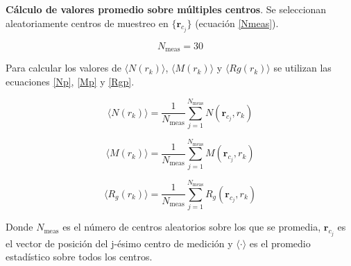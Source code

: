 	\textbf{Cálculo de valores promedio sobre múltiples centros}. Se seleccionan aleatoriamente centros de muestreo en $\{\mathbf{r}_{c_j}\}$ (ecuación \ref{Nmeas}). 
	
	
	\begin{equation}
		N_{\text{meas}} = 30  
		\label{Nmeas}
	\end{equation}
	
	Para calcular los valores de $\langle N(r_k) \rangle$, $\langle M(r_k) \rangle$ y $\langle Rg(r_k) \rangle$ se utilizan las ecuaciones \ref{Np}, \ref{Mp} y \ref{Rgp}.
	
	\begin{equation}
		\langle N(r_k) \rangle = \frac{1}{N_{\text{meas}}} 
		\sum_{j=1}^{N_{\text{meas}}} N(\mathbf{r}_{c_j}, r_k)
		\label{Np}
	\end{equation}
	
	\begin{equation}
		\langle M(r_k) \rangle = \frac{1}{N_{\text{meas}}} 
		\sum_{j=1}^{N_{\text{meas}}} M(\mathbf{r}_{c_j}, r_k)
		\label{Mp}
	\end{equation}
	
	\begin{equation}
		\langle R_g(r_k) \rangle = \frac{1}{N_{\text{meas}}} 
		\sum_{j=1}^{N_{\text{meas}}} R_g(\mathbf{r}_{c_j}, r_k)
		\label{Rgp}
	\end{equation}
	
	Donde $N_{\text{meas}}$ es el número de centros aleatorios sobre los que se promedia,
	$\mathbf{r}_{c_j}$ es el vector de posición del j-ésimo centro de medición y
	$\langle\cdot\rangle$ es el promedio estadístico sobre todos los centros.

